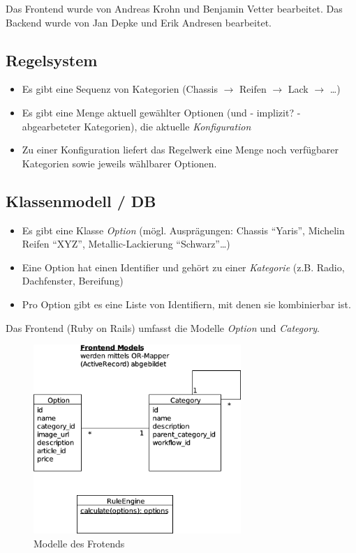 \documentclass[a4paper,10pt]{article}
\begin{document}
Das Frontend wurde von Andreas Krohn und Benjamin Vetter bearbeitet.
Das Backend wurde von Jan Depke und Erik Andresen bearbeitet.
 
\subsection*{Regelsystem}

\begin{itemize}
 \item Es gibt eine Sequenz von Kategorien (Chassis $\rightarrow$ Reifen $\rightarrow$ Lack $\rightarrow$ \ldots)
 \item Es gibt eine Menge aktuell gewählter Optionen (und - implizit? - abgearbeteter Kategorien), die aktuelle \emph{Konfiguration}
 \item Zu einer Konfiguration liefert das Regelwerk eine Menge noch verfügbarer Kategorien sowie jeweils wählbarer Optionen.
\end{itemize}

\subsection*{Klassenmodell / DB}

\begin{itemize}
 \item Es gibt eine Klasse \emph{Option} (mögl. Ausprägungen: Chassis "`Yaris"', Michelin Reifen "`XYZ"', Metallic-Lackierung "`Schwarz"'\ldots)
 \item Eine Option hat einen Identifier und gehört zu einer \emph{Kategorie} (z.B. Radio, Dachfenster, Bereifung)
 \item Pro Option gibt es eine Liste von Identifiern, mit denen sie kombinierbar ist.
\end{itemize}

Das Frontend (Ruby on Rails) umfasst die Modelle \textit{Option} und \textit{Category}.

\begin{center}
  \begin{figure}[t]
    \includegraphics[width=0.7\textwidth]{doc/frontend_models.png}
    \caption{Modelle des Frotends}
    \label{frontend_models}
  \end{figure}
\end{center}
\end{document}
